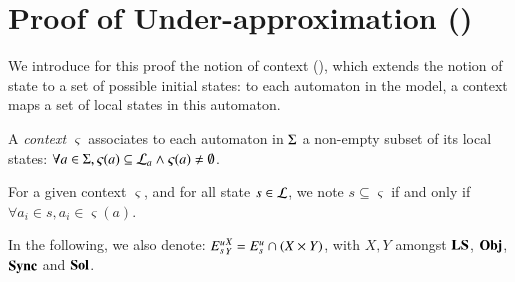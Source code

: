 \section{Proof of Under-approximation ()}
\label{suppl:demoapproxinf}

We introduce for this proof the notion of context (),
which extends the notion of state to a set of possible initial states:
to each automaton in the model, a context maps a set of local states in this automaton.
\begin{definition}[Context]
\label{def:context}
  A \emph{context} $\varsigma$ associates to each automaton in $\Sigma$ a non-empty subset of its local states:
  $\forall a \in \Sigma, \varsigma(a) \subseteq \mathcal{L}_a \wedge \varsigma(a) \neq \emptyset$.
\end{definition}

For a given context $\varsigma$,
and for all state $s \in \mathcal{L}$,
we note $s \subseteq \varsigma$ if and only if $\forall a_i \in s, a_i \in \varsigma(a)$.

In the following, we also denote:
${E_s^u}^{X}_{Y} = {E_s^u} \cap (X \times Y)$, with $X, Y$
amongst $\mathbf{LS}$, $\mathbf{Obj}$, $\mathbf{Sync}$ and $\mathbf{Sol}$.

